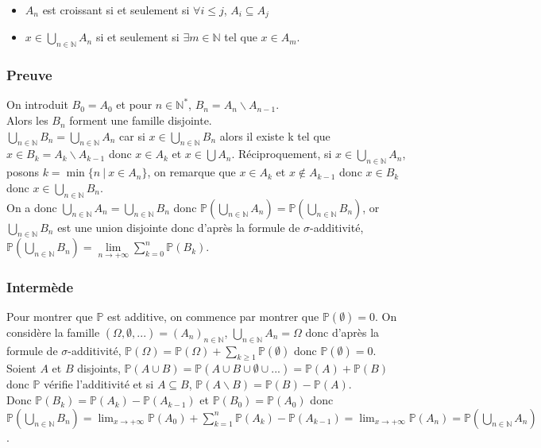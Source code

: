 \documentclass[a4paper,10pt]{book} %
\newcommand{\N}{\mathbb{N}}
\renewcommand{\P}{\mathbb{P}} %
\newcommand{\tq}{~|~}
\begin{document}
\begin{itemize}[label=$\cdot$]
\item $A_n$ est croissant si et seulement si $\forall i\leq j$, $A_i\subseteq A_j$
\item $\displaystyle x\in \bigcup_{n\in \N}A_n$ si et seulement si $\exists m\in \N$ tel que $x\in A_m$.
\end{itemize}

\subsubsection{Preuve}
On introduit $B_0=A_0$ et pour $n\in \N^*$, $B_n=A_n\backslash A_{n-1}$.\\
Alors les $B_n$ forment une famille disjointe.\\

$\displaystyle \bigcup_{n\in\N} B_n=\bigcup_{n\in \N} A_n$ car si $\displaystyle x\in \bigcup_{n\in \N}B_n$ alors il existe k tel que $x\in B_k=A_k\backslash A_{k-1}$ donc $x\in A_k$ et $\displaystyle x\in \bigcup A_n$. Réciproquement, si $\displaystyle x\in \bigcup_{n\in \N}A_n$, posons $k=\min\{n\tq x\in A_n\}$, on remarque que $x\in A_k$ et $x\notin A_{k-1}$ donc $x\in B_k$ donc $\displaystyle x\in \bigcup_{n\in \N}B_n$.\\

On a donc $\displaystyle \bigcup_{n\in \N} A_n=\bigcup_{n\in \N}B_n$ donc $\displaystyle \P(\bigcup_{n\in\N}A_n)=\P(\bigcup_{n\in\N}B_n)$, or $\displaystyle \bigcup_{n\in\N}B_n$ est une union disjointe donc d'après la formule de $\sigma$-additivité, $\displaystyle \P(\bigcup_{n\in\N}B_n)=\lim\limits_{n\rightarrow +\infty} \sum_{k=0}^n\P(B_k)$.

\subsubsection{Intermède}
Pour montrer que $\P$ est additive, on commence par montrer que $\P(\emptyset)=0$. On considère la famille $(\Omega,\emptyset, ...)=(A_n)_{n\in\N}$, $\displaystyle \bigcup_{n\in\N}A_n=\Omega$ donc d'après la formule de $\sigma$-additivité, $\displaystyle \P(\Omega)=\P(\Omega)+\sum_{k\geq 1}\P(\emptyset)$ donc $\P(\emptyset)=0$.\\

Soient $A$ et $B$ disjoints, $\P(A\cup B)=\P(A\cup B\cup \emptyset\cup...)=\P(A)+\P(B)$ donc $\P$ vérifie l'additivité et si $A\subseteq B$, $\P(A\backslash B)=\P(B)-\P(A)$.\\
Donc $\P(B_k)=\P(A_k)-\P(A_{k-1})$ et $\P(B_0)=\P(A_0)$ donc $\displaystyle \P(\bigcup_{n\in \N} B_n)=\lim_{x\rightarrow +\infty}\P(A_0)+\sum_{k=1}^n\P(A_k)-\P(A_{k-1})=\lim_{x\rightarrow +\infty}\P(A_n)=\P(\bigcup_{n\in \N}A_n)$.
\end{document}
